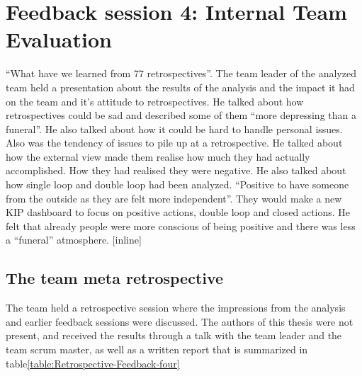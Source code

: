 \section{Feedback session 4: Internal Team Evaluation}
\label{section:feedback-session 4}
``What have we learned from 77 retrospectives''. The team leader of the analyzed team held a presentation about the results of the analysis and the impact it had on the team and it's attitude to retrospectives. He talked about how retrospectives could be sad and described some of them ``more depressing than a funeral''. He also talked about how it could be hard to handle personal issues. Also was the tendency of issues to pile up at a retrospective. He talked about how the external view made them realise how much they had actually accomplished. How they had realised they were negative. He also talked about how single loop and double loop had been analyzed. ``Positive to have someone from the outside as they are felt more independent''. They would make a new KIP dashboard to focus on positive actions, double loop and closed actions. He felt that already people were more conscious of being positive and there was less a ``funeral'' atmosphere.  
[inline]

\subsection{The team meta retrospective}
The team held a retrospective session where the impressions from the analysis and earlier feedback sessions were discussed. The authors of this thesis were not present, and received the results through a talk with the team leader and the team scrum master, as well as a written report that is summarized in table\autoref{table:Retrospective-Feedback-four}

